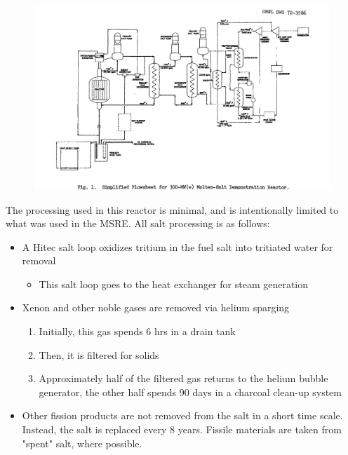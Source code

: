 \documentclass[letterpaper]{article}
\begin{document}
\begin{figure}[H]
  \centering
  \includegraphics[width=1.0\linewidth]{figures/MSDRsource2.png}
  \label{fig:fig6}
\end{figure}

The processing used in this reactor is minimal, and is intentionally limited to what was used in the MSRE.  All salt processing is as follows:

\begin{itemize}
\item A Hitec salt loop oxidizes tritium in the fuel salt into tritiated water for removal
	\begin{itemize}
	\item This salt loop goes to the heat exchanger for steam generation
	\end{itemize}
\item Xenon and other noble gases are removed via helium sparging
	\begin{enumerate}
	\item Initially, this gas spends 6 hrs in a drain tank
	\item Then, it is filtered for solids
	\item Approximately half of the filtered gas returns to the helium bubble generator, the other half spends 90 days in a charcoal clean-up system
	\end{enumerate}
\item Other fission products are not removed from the salt in a short time scale.  Instead, the salt is replaced every 8 years.  Fissile materials are taken from "spent" salt, where possible.
\end{itemize}
\end{document}
